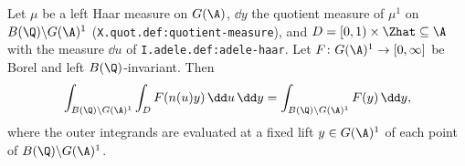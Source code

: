 Let $\mu$ be a left Haar measure on $G(\A)$, $\dd y$ the quotient measure of $\mu^1$ on $B(\Q)\backslash G(\A)^1$ (\texttt{X.quot.def:quotient-measure}), and
$D=[0,1)\times\Zhat\subseteq\A$ with the measure $\dd u$ of \texttt{I.adele.def:adele-haar}. Let $F\colon G(\A)^1\to[0,\infty]$ be Borel and left $B(\Q)$-invariant. Then
\[
  \int_{B(\Q)\backslash G(\A)^1}\int_DF(n(u)y)\,\dd u\,\dd y=\int_{B(\Q)\backslash G(\A)^1}F(y)\,\dd y ,
\]
where the outer integrands are evaluated at a fixed lift $y\in G(\A)^1$ of each point of $B(\Q)\backslash G(\A)^1$.
